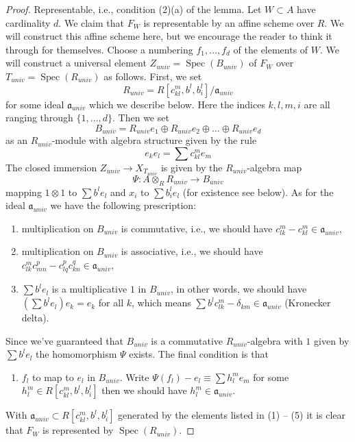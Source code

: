 \documentclass[10pt,a4paper]{amsart}
\theoremstyle{plain}
\theoremstyle{definition}
\theoremstyle{remark}
\numberwithin{equation}{subsection}
\def\Spec{\mathop{\mathrm{Spec}}}
\begin{document}
\begin{proof}
\medskip\noindent
Representable, i.e., condition (2)(a) of the lemma. Let $W \subset A$
have cardinality $d$. We claim that $F_W$ is representable by an affine
scheme over $R$. We will construct this affine scheme here, but we encourage
the reader to think it through for themselves. Choose a numbering
$f_1, \ldots, f_d$ of the elements of $W$. We will construct a universal
element $Z_{univ} = \Spec(B_{univ})$ of $F_W$ over $T_{univ} = \Spec(R_{univ})$
as follows. First, we set
$$
R_{univ} = R[c_{kl}^m, b^l, b_i^l]/\mathfrak a_{univ}
$$
for some ideal $\mathfrak a_{univ}$ which we describe below.
Here the indices $k, l, m, i$ are all ranging through $\{1, \ldots, d\}$.
Then we set
$$
B_{univ} = R_{univ}e_1 \oplus R_{univ}e_2 \oplus \ldots \oplus R_{univ}e_d
$$
as an $R_{univ}$-module with algebra structure given by the rule
$$
e_ke_l = \sum c_{kl}^m e_m
$$
The closed immersion $Z_{univ} \to X_{T_{univ}}$ is given
by the $R_{univ}$-algebra map
$$
\Psi : A \otimes_R R_{univ} \longrightarrow B_{univ}
$$
mapping $1 \otimes 1$ to $\sum b^le_l$ and $x_i$ to $\sum b_i^le_l$
(for existence see below). As for the ideal $\mathfrak a_{univ}$
we have the following prescription:
\begin{enumerate}
\item multiplication on $B_{univ}$ is commutative, i.e.,
we should have $c_{lk}^m - c_{kl}^m \in \mathfrak a_{univ}$,
\item multiplication on $B_{univ}$ is associative, i.e.,
we should have $c_{lk}^m c_{m n}^p - c_{lq}^p c_{kn}^q \in \mathfrak a_{univ}$,
\item $\sum b^le_l$ is a multiplicative $1$ in $B_{univ}$,
in other words, we should have $(\sum b^le_l)e_k = e_k$ for all $k$,
which means $\sum b^lc_{lk}^m - \delta_{km} \in \mathfrak a_{univ}$
(Kronecker delta).
\end{enumerate}
Since we've guaranteed that $B_{univ}$ is a commutative
$R_{univ}$-algebra with $1$ given by $\sum b^le_l$ the homomorphism $\Psi$
exists. The final condition is that
\begin{enumerate}
\item[(5)] $f_l$ to map to $e_l$ in $B_{univ}$. Write
$\Psi(f_l) - e_l \equiv \sum h_l^me_m$ for some
$h_l^m \in R[c_{kl}^m, b^l, b_i^l]$
then we should have $h_l^m \in \mathfrak a_{univ}$.
\end{enumerate}
With $\mathfrak a_{univ} \subset R[c_{kl}^m, b^l, b_i^l]$ generated
by the elements listed in (1) -- (5)
it is clear that $F_W$ is represented by $\Spec(R_{univ})$.
\end{proof}
\end{document}
